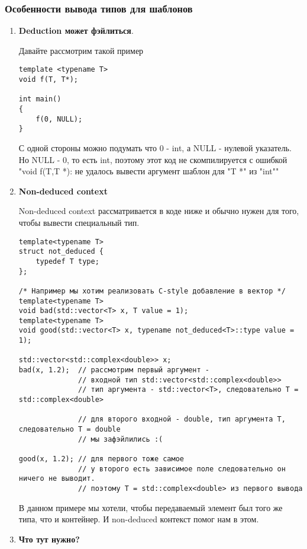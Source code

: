 		\subsubsection{Особенности вывода типов для шаблонов}
			\begin{enumerate}
				\item \textbf{Deduction может фэйлиться}.
				
				Давайте рассмотрим такой пример
\begin{verbatim}
template <typename T>
void f(T, T*);

int main()
{
	f(0, NULL);
}
				\end{verbatim}
				С одной стороны можно подумать что 0 - int, а NULL - нулевой указатель. Но NULL - 0, то есть int, поэтому этот код не скомпилируется с ошибкой "void f(T,T *): не удалось вывести аргумент шаблон для "T *" из "int""
				
				\item \textbf{Non-deduced context}
				
				Non-deduced context рассматривается в коде ниже и обычно нужен для того, чтобы вывести специальный тип.
\begin{verbatim}
template<typename T>
struct not_deduced {
	typedef T type;
};

/* Например мы хотим реализовать С-style добавление в вектор */
template<typename T>
void bad(std::vector<T> x, T value = 1);
template<typename T>
void good(std::vector<T> x, typename not_deduced<T>::type value = 1);

std::vector<std::complex<double>> x;
bad(x, 1.2);  // рассмотрим первый аргумент -
			  // входной тип std::vector<std::complex<double>>
			  // тип аргумента - std::vector<T>, следовательно T = std::complex<double>

			  // для второго входной - double, тип аргумента T, следовательно T = double
			  // мы зафэйлились :(

good(x, 1.2); // для первого тоже самое
			  // у второго есть зависимое поле следовательно он ничего не выводит.
			  // поэтому T = std::complex<double> из первого вывода
\end{verbatim}
				
				В данном примере мы хотели, чтобы передаваемый элемент был того же типа, что и контейнер. И non-deduced контекст помог нам в этом.
				\item \textbf{Что тут нужно?}
			

\end{enumerate}
